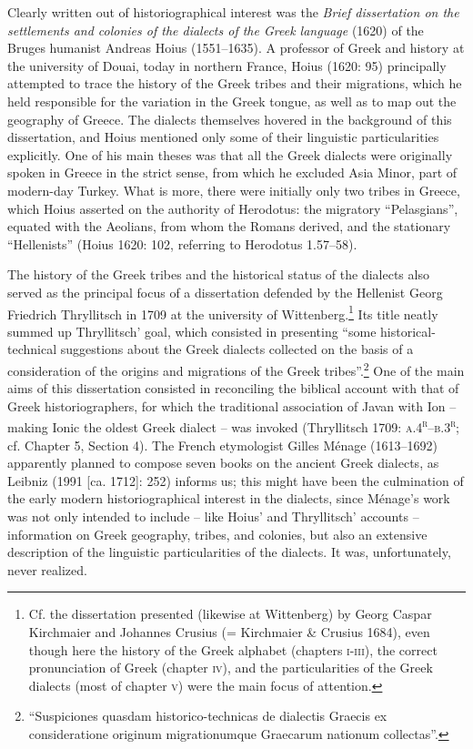 \documentclass[12pt]{article}
\newenvironment{styleStandard}{\renewcommand\baselinestretch{1.25}\setlength\leftskip{0in}\setlength\rightskip{0in}\setlength\parindent{0.1972in}\setlength\parfillskip{0pt plus 1fil}\setlength\parskip{0in plus 1pt}\writerlistparindent\writerlistleftskip\leavevmode\normalfont\normalsize\writerlistlabel\ignorespaces}{\unskip\vspace{0in plus 1pt}\par}
\newcommand\writerlistleftskip{}
\newcommand\writerlistparindent{}
\newcommand\writerlistlabel{}
\begin{document}
\begin{styleStandard}
Clearly written out of historiographical interest was the \textit{Brief dissertation on the settlements and colonies of the dialects of the Greek language} (1620) of the Bruges humanist Andreas Hoius (1551–1635). A professor of Greek and history at the university of Douai, today in northern France, Hoius (1620: 95) principally attempted to trace the history of the Greek tribes and their migrations, which he held responsible for the variation in the Greek tongue, as well as to map out the geography of Greece. The dialects themselves hovered in the background of this dissertation, and Hoius mentioned only some of their linguistic particularities explicitly. One of his main theses was that all the Greek dialects were originally spoken in Greece in the strict sense, from which he excluded Asia Minor, part of modern-day Turkey.\textsuperscript{ }What is more, there were initially only two tribes in Greece, which Hoius asserted on the authority of Herodotus: the migratory “Pelasgians”, equated with the Aeolians, from whom the Romans derived, and the stationary “Hellenists” (Hoius 1620: 102, referring to Herodotus 1.57–58).
\end{styleStandard}

\begin{styleStandard}
The history of the Greek tribes and the historical status of the dialects also served as the principal focus of a dissertation defended by the Hellenist Georg Friedrich Thryllitsch in 1709 at the university of Wittenberg.\footnote{ Cf. the dissertation presented (likewise at Wittenberg) by Georg Caspar Kirchmaier and Johannes Crusius (= Kirchmaier \& Crusius 1684), even though here the history of the Greek alphabet (chapters \textsc{i}{}-\textsc{iii}), the correct pronunciation of Greek (chapter \textsc{iv}), and the particularities of the Greek dialects (most of chapter \textsc{v}) were the main focus of attention.} Its title neatly summed up Thryllitsch’ goal, which consisted in presenting “some historical-technical suggestions about the Greek dialects collected on the basis of a consideration of the origins and migrations of the Greek tribes”.\footnote{ “Suspiciones quasdam historico-technicas de dialectis Graecis ex consideratione originum migrationumque Graecarum nationum collectas”.} One of the main aims of this dissertation consisted in reconciling the biblical account with that of Greek historiographers, for which the traditional association of Javan with Ion – making Ionic the oldest Greek dialect – was invoked (Thryllitsch 1709: \textsc{a.4}\textsc{\textsuperscript{r}}\textsc{–b.3}\textsc{\textsuperscript{r}}; cf. Chapter 5, Section 4). The French etymologist Gilles Ménage (1613–1692) apparently planned to compose seven books on the ancient Greek dialects, as Leibniz (1991 [ca. 1712]: 252) informs us; this might have been the culmination of the early modern historiographical interest in the dialects, since Ménage’s work was not only intended to include – like Hoius’ and Thryllitsch’ accounts – information on Greek geography, tribes, and colonies, but also an extensive description of the linguistic particularities of the dialects. It was, unfortunately, never realized.
\end{styleStandard}
\end{document}
